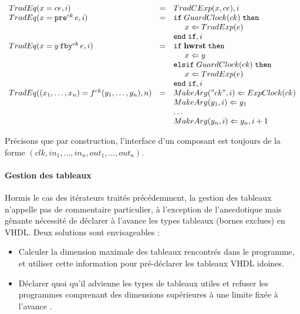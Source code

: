 \documentclass[a4paper]{article}
\newcommand{\mybox}[1]{\mbox{\tt{#1}}}
\newcommand{\ind}[0]{\hspace{0.5cm}}
\newcommand{\Fby}[2]{#1 \, \mybox{fby}^{ck} \, #2}
\newcommand{\Pre}[1]{\mybox{pre}^{ck} \, #1}
\newcommand{\App}[2]{#1^{ck}(#2)}
\newcommand{\Assign}[2]{#1 \Leftarrow #2}
\begin{document}
\[
\begin{array}{lcl}
  \TradEq{x = ce}{i} & = & \TradCE{x}{ce}, i \\

  \TradEq{x = \Pre{e}}{i} & = & \mathtt{if} \; \GEC{ck} \; \mathtt{then} \\
  & & \ind \Assign{x}{\TradE{e}} \\
  & & \mathtt{end} \; \mathtt{if}, i \\

  \TradEq{x = \Fby{y}{e}}{i} & = & \mathtt{if} \; \mathbf{hwrst}
  \; \mathtt{then} \\
  & & \ind \Assign{x}{y} \\
  & & \mathtt{elsif} \; \GEC{ck} \; \mathtt{then} \\
  & & \ind \Assign{x}{\TradE{e}} \\
  & & \mathtt{end} \; \mathtt{if}, i \\


  \TradEq{(x_1,\dots,x_n) = \App{f}{y_1,\dots,y_n}}{n} & = &
  \Assign{\MA{"ck"}{i}}{\EC{ck}} \\
  & & \Assign{\MA{y_1}{i}}{y_1} \\
  & & \dots \\
  & & \Assign{\MA{y_n}{i}}{y_n}, i + 1 \\
\end{array}
\]

Pr\'ecisons que par construction, l'interface d'un composant est toujours de la
forme $(clk, in_1, \dots,in_n, out_1,\dots,out_n)$.

\paragraph{Gestion des tableaux}

Hormis le cas des it\'erateurs trait\'es pr\'ec\'edemment, la gestion des tableaux
n'appelle pas de commentaire particulier, \`a l'exception de l'anecdotique mais
g\^enante n\'ecessit\'e de d\'eclarer \`a l'avance les types tableaux (bornes exclues) en
VHDL. Deux solutions sont envisageables :

\begin{itemize}
\item Calculer la dimension maximale des tableaux rencontr\'es dans le programme,
  et utiliser cette information pour pr\'e-d\'eclarer les tableaux VHDL idoines.
\item D\'eclarer quoi qu'il advienne les types de tableaux utiles et refuser les
  programmes comprenant des dimensions sup\'erieures \`a une limite fix\'ee \`a l'avance
  .
\end{itemize}
\end{document}
